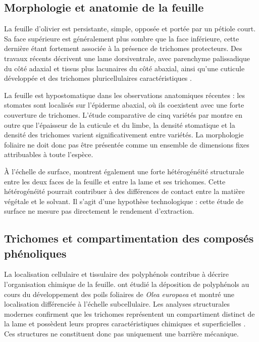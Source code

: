 \subsection{Morphologie et anatomie de la feuille}

La feuille d'olivier est persistante, simple, opposée et portée par un pétiole court. Sa face supérieure est généralement plus sombre que la face inférieure, cette dernière étant fortement associée à la présence de trichomes protecteurs. Des travaux récents décrivent une lame dorsiventrale, avec parenchyme palissadique du côté adaxial et tissus plus lacunaires du côté abaxial, ainsi qu'une cuticule développée et des trichomes pluricellulaires caractéristiques \citep{Betuzzi2025,Alvarez2026}.

La feuille est hypostomatique dans les observations anatomiques récentes : les stomates sont localisés sur l'épiderme abaxial, où ils coexistent avec une forte couverture de trichomes. L'étude comparative de cinq variétés par \citet{Alvarez2026} montre en outre que l'épaisseur de la cuticule et du limbe, la densité stomatique et la densité des trichomes varient significativement entre variétés. La morphologie foliaire ne doit donc pas être présentée comme un ensemble de dimensions fixes attribuables à toute l'espèce.

À l'échelle de surface, \citet{Fernandez2024} montrent également une forte hétérogénéité structurale entre les deux faces de la feuille et entre la lame et ses trichomes. Cette hétérogénéité pourrait contribuer à des différences de contact entre la matière végétale et le solvant. Il s'agit d'une hypothèse technologique : cette étude de surface ne mesure pas directement le rendement d'extraction.

\subsection{Trichomes et compartimentation des composés phénoliques}

La localisation cellulaire et tissulaire des polyphénols contribue à décrire l'organisation chimique de la feuille. \citet{Karabourniotis1998} ont étudié la déposition de polyphénols au cours du développement des poils foliaires de \textit{Olea europaea} et montré une localisation différenciée à l'échelle subcellulaire. Les analyses structurales modernes confirment que les trichomes représentent un compartiment distinct de la lame et possèdent leurs propres caractéristiques chimiques et superficielles \citep{Fernandez2024}. Ces structures ne constituent donc pas uniquement une barrière mécanique.

